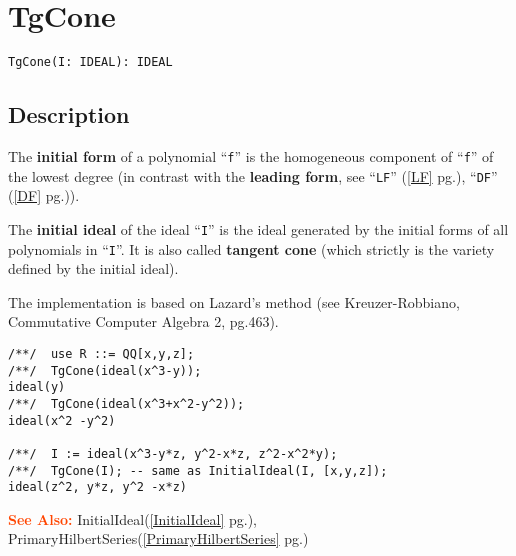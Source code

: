 \documentclass[a4paper]{mybook}
\newenvironment{command}{}{} %
\newcommand\SeeAlso{\par\textcolor{OrangeRed}{\textbf{\large See Also: }}}
\begin{document}
\section{TgCone}
\label{TgCone}
\begin{command} %


\begin{Verbatim}[label=syntax, rulecolor=\color{MidnightBlue},
frame=single]
TgCone(I: IDEAL): IDEAL
\end{Verbatim}


\subsection*{Description}

The \textbf{initial form} of a polynomial ``\verb&f&'' is the homogeneous
component of ``\verb&f&'' of the lowest degree (in contrast with the
\textbf{leading form}, see ``\verb&LF&'' (\ref{LF} pg.\pageref{LF}), ``\verb&DF&'' (\ref{DF} pg.\pageref{DF})).
\par 
The \textbf{initial ideal} of the ideal ``\verb&I&'' is the ideal
generated by the initial forms of all polynomials in ``\verb&I&''.
It is also called \textbf{tangent cone} (which strictly is the variety
defined by the initial ideal).
\par 
The implementation is based on Lazard's method
(see Kreuzer-Robbiano, Commutative Computer Algebra 2, pg.463).
\begin{Verbatim}[label=example, rulecolor=\color{PineGreen}, frame=single]
/**/  use R ::= QQ[x,y,z];
/**/  TgCone(ideal(x^3-y));
ideal(y)
/**/  TgCone(ideal(x^3+x^2-y^2));
ideal(x^2 -y^2)

/**/  I := ideal(x^3-y*z, y^2-x*z, z^2-x^2*y);
/**/  TgCone(I); -- same as InitialIdeal(I, [x,y,z]);
ideal(z^2, y*z, y^2 -x*z)
\end{Verbatim}


\SeeAlso %
  InitialIdeal(\ref{InitialIdeal} pg.\pageref{InitialIdeal}), 
    PrimaryHilbertSeries(\ref{PrimaryHilbertSeries} pg.\pageref{PrimaryHilbertSeries})
\end{command} %
\end{document}
